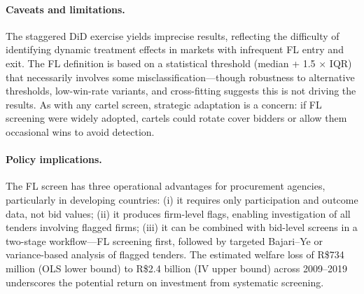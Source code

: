 \paragraph{Caveats and limitations.}
The staggered DiD exercise yields imprecise results, reflecting the
difficulty of identifying dynamic treatment effects in markets with
infrequent FL entry and exit. The FL definition is based on a
statistical threshold (median + 1.5 $\times$ IQR) that necessarily
involves some misclassification---though robustness to alternative
thresholds, low-win-rate variants, and cross-fitting suggests this is
not driving the results. As with any cartel screen, strategic adaptation
is a concern: if FL screening were widely adopted, cartels could rotate
cover bidders or allow them occasional wins to avoid detection.

\paragraph{Policy implications.}
The FL screen has three operational advantages for procurement agencies,
particularly in developing countries: (i) it requires only participation
and outcome data, not bid values; (ii) it produces firm-level flags,
enabling investigation of all tenders involving flagged firms; (iii) it
can be combined with bid-level screens in a two-stage workflow---FL
screening first, followed by targeted Bajari--Ye or variance-based
analysis of flagged tenders. The estimated welfare loss of R\$734 million (OLS lower bound) to
R\$2.4 billion (IV upper bound) across 2009--2019 underscores the
potential return on investment from systematic screening.

